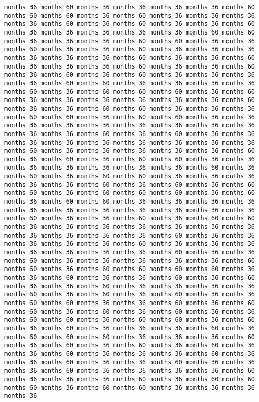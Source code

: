\documentclass[11pt]{article}
\begin{document}
\begin{Verbatim}[commandchars=\\\{\}, frame=single, framerule=2mm, rulecolor=\color{outerrorbackground}]
months 36 months 60 months 36 months 36 months 36 months 36 months 60 months 60 months 60 months 36 months 60 months 36 months 36 months 36 months 36 months 60 months 36 months 60 months 36 months 36 months 60 months 36 months 36 months 36 months 36 months 36 months 60 months 60 months 36 months 36 months 36 months 60 months 60 months 36 months 36 months 60 months 36 months 36 months 60 months 36 months 36 months 36 months 36 months 36 months 36 months 60 months 36 months 36 months 60 months 36 months 36 months 36 months 60 months 36 months 36 months 60 months 36 months 60 months 36 months 60 months 36 months 36 months 36 months 36 months 60 months 60 months 36 months 36 months 36 months 36 months 60 months 36 months 60 months 60 months 60 months 36 months 60 months 36 months 36 months 36 months 36 months 36 months 36 months 60 months 36 months 36 months 60 months 60 months 36 months 36 months 36 months 60 months 60 months 36 months 60 months 60 months 36 months 36 months 36 months 36 months 36 months 36 months 36 months 36 months 36 months 36 months 36 months 60 months 36 months 60 months 36 months 36 months 36 months 36 months 36 months 36 months 36 months 36 months 36 months 60 months 36 months 36 months 36 months 36 months 36 months 60 months 36 months 60 months 36 months 60 months 60 months 36 months 36 months 36 months 36 months 36 months 36 months 36 months 60 months 36 months 60 months 36 months 60 months 60 months 36 months 36 months 36 months 36 months 36 months 60 months 36 months 60 months 36 months 60 months 60 months 36 months 60 months 60 months 60 months 36 months 60 months 36 months 60 months 60 months 36 months 36 months 36 months 36 months 36 months 36 months 36 months 36 months 36 months 36 months 36 months 60 months 36 months 36 months 60 months 36 months 60 months 60 months 36 months 36 months 36 months 36 months 36 months 36 months 36 months 36 months 36 months 36 months 36 months 60 months 36 months 36 months 36 months 36 months 36 months 60 months 36 months 36 months 36 months 36 months 36 months 36 months 36 months 60 months 36 months 36 months 60 months 36 months 36 months 36 months 36 months 36 months 60 months 60 months 36 months 60 months 60 months 60 months 60 months 36 months 36 months 60 months 36 months 36 months 60 months 36 months 60 months 36 months 36 months 60 months 36 months 36 months 36 months 36 months 60 months 36 months 60 months 36 months 60 months 36 months 36 months 60 months 60 months 36 months 36 months 60 months 36 months 60 months 60 months 36 months 60 months 36 months 60 months 36 months 36 months 60 months 60 months 36 months 60 months 60 months 36 months 60 months 36 months 60 months 36 months 36 months 36 months 60 months 36 months 60 months 60 months 60 months 36 months 36 months 36 months 60 months 36 months 60 months 36 months 60 months 36 months 60 months 36 months 36 months 60 months 36 months 36 months 36 months 60 months 36 months 36 months 60 months 36 months 36 months 60 months 36 months 36 months 36 months 60 months 36 months 36 months 36 months 36 months 60 months 36 months 36 months 36 months 60 months 36 months 60 months 60 months 60 months 36 months 60 months 60 months 36 months 36 months 36 months 36 
\end{Verbatim}
\end{document}
